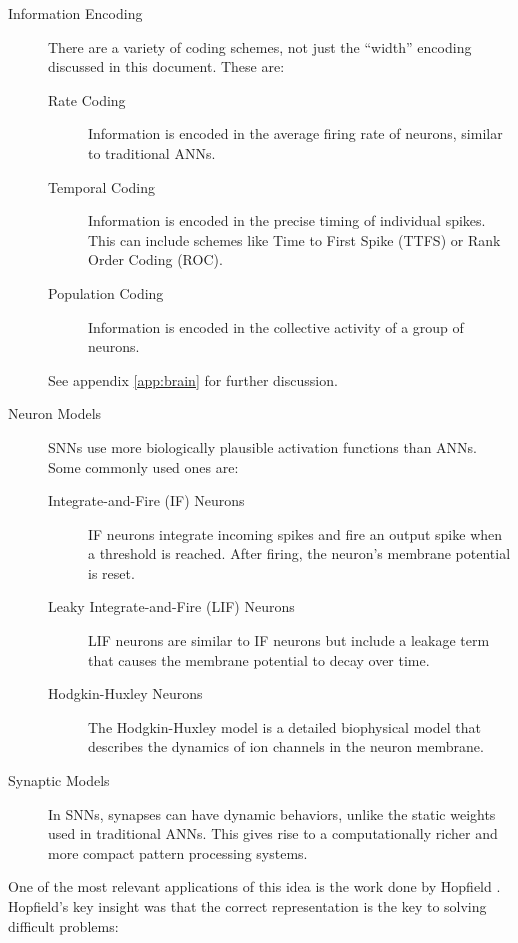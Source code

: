 \documentclass{article}
\begin{document}
\begin{description}
	\item[Information Encoding] There are a variety of coding schemes, not just the ``width'' encoding discussed in this document. These are:
	      \begin{description}
		      \item[Rate Coding] Information is encoded in the average firing rate of neurons, similar to traditional ANNs.
		      \item[Temporal Coding] Information is encoded in the precise timing of individual spikes. This can include schemes like Time to First Spike (TTFS) or Rank Order Coding (ROC).
		      \item[Population Coding] Information is encoded in the collective activity of a group of neurons.
	      \end{description}
	      See appendix \ref{app:brain} for further discussion.

	\item[Neuron Models] SNNs use more biologically plausible activation functions than ANNs. Some commonly used ones are:
	      \begin{description}
		      \item[Integrate-and-Fire (IF) Neurons] \cite{burkitt2006review} IF neurons integrate incoming spikes and fire an output spike when a threshold is reached. After firing, the neuron's membrane potential is reset.
		      \item[Leaky Integrate-and-Fire (LIF) Neurons] \cite{tal1997computing} LIF neurons are similar to IF neurons but include a leakage term that causes the membrane potential to decay over time.
		      \item[Hodgkin-Huxley Neurons] \cite{y2003computation} The Hodgkin-Huxley model is a detailed biophysical model that describes the dynamics of ion channels in the neuron membrane.
	      \end{description}
	\item[Synaptic Models] In SNNs, synapses can have dynamic behaviors, unlike the static weights used in traditional ANNs. This gives rise to a computationally richer and more compact pattern processing systems.
\end{description}

One of the most relevant applications of this idea is the work done by Hopfield \cite{hopfield1995pattern}. Hopfield's key insight was that the correct representation is the key to solving difficult problems:
\end{document}
